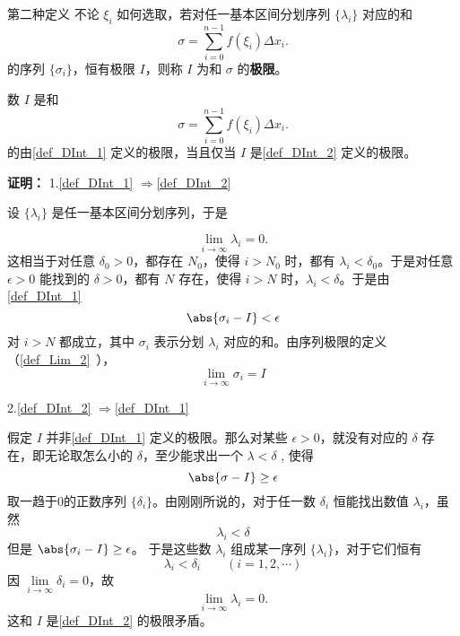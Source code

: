 \begin{definition}{第二种定义}
不论 $\xi_i$ 如何选取，若对任一基本区间分划序列 $\{\lambda_i\}$ 对应的和 
\begin{equation}
\sigma=\sum_{i=0}^{n-1}f(\xi_i)\Delta x_i.
\end{equation}
的序列 $\{\sigma_i\}$，恒有极限 $I$，则称 $I$ 为和 $\sigma$ 的\textbf{极限}。
\end{definition}
\begin{theorem}{}
数 $I$ 是和 
\begin{equation}
\sigma=\sum_{i=0}^{n-1}f(\xi_i)\Delta x_i.
\end{equation}
的由\autoref{def_DInt_1} 定义的极限，当且仅当 $I$ 是\autoref{def_DInt_2} 定义的极限。
\end{theorem}
\textbf{证明：}
1.\autoref{def_DInt_1} $\Rightarrow$\autoref{def_DInt_2} 

设 $\{\lambda_i\}$ 是任一基本区间分划序列，于是 

\begin{equation}
\lim\limits_{i\rightarrow\infty}\lambda_i=0.
\end{equation}
这相当于对任意 $\delta_0>0$，都存在 $N_0$，使得 $i>N_0$ 时，都有 $\lambda_i<\delta_0$。于是对任意 $\epsilon>0$ 能找到的 $\delta>0$，都有 $N$ 存在，使得 $i>N$ 时，$\lambda_i<\delta$。于是由\autoref{def_DInt_1} 
\begin{equation}
\abs{\sigma_i-I}<\epsilon
\end{equation}
对 $i>N$ 都成立，其中 $\sigma_i$ 表示分划 $\lambda_i$ 对应的和。由序列极限的定义（\autoref{def_Lim_2}~），
\begin{equation}
\lim_{i\rightarrow\infty} \sigma_i=I
\end{equation}

2.\autoref{def_DInt_2} $\Rightarrow$\autoref{def_DInt_1} 

假定 $I$ 并非\autoref{def_DInt_1} 定义的极限。那么对某些 $\epsilon>0$，就没有对应的 $\delta$ 存在，即无论取怎么小的 $\delta$，至少能求出一个 $\lambda<\delta$ , 使得
\begin{equation}
\abs{\sigma-I}\geq\epsilon
\end{equation}
取一趋于0的正数序列 $\{\delta_i\}$。由刚刚所说的，对于任一数 $\delta_i$ 恒能找出数值 $\lambda_i$，虽然
\begin{equation}
\lambda_i<\delta
\end{equation}
但是 $\abs{\sigma_i-I}\geq\epsilon$。
于是这些数 $\lambda_i$ 组成某一序列 $\{\lambda_i\}$，对于它们恒有
\begin{equation}
\lambda_i<\delta_i\qquad(i=1,2,\cdots)
\end{equation}
因 $\lim\limits_{i\rightarrow\infty}\delta_i=0$，故
\begin{equation}
\lim\limits_{i\rightarrow\infty}\lambda_i=0.
\end{equation}
这和 $I$ 是\autoref{def_DInt_2} 的极限矛盾。

